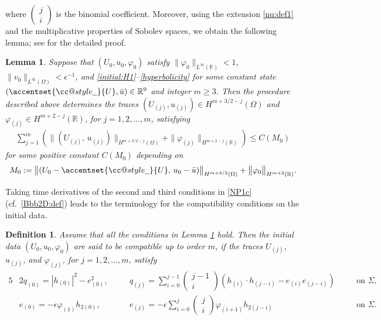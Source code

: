 \documentclass[twoside,11pt]{article}
\makeatletter
\numberwithin{equation}{section}
\newtheorem{lemma}{Lemma}[section]
\newtheorem{definition}{Definition}[section]
\def\widebar{\accentset{{\cc@style\underline{\mskip10mu}}}}
\makeatother
\begin{document}
where $\left(\begin{smallmatrix}
	j \\[0.3mm] i
\end{smallmatrix}\right)$ is the binomial coefficient.
Moreover, using the extension \eqref{nu:def1} and the multiplicative properties of Sobolev spaces, we obtain the following lemma; see \cite[Lemma 4.2.1]{M01MR1842775} for the detailed proof.
\begin{lemma} \label{lem:CA1}
	Suppose that %
	$(U_0,u_0,\varphi_0)$ satisfy $\|\varphi_0\|_{L^{\infty}(\mathbb{R})}<1$,
	{$\|v_0\|_{L^{\infty}(\Omega)}<\epsilon^{-1}$,} and \eqref{initial:H1}--\eqref{hyperbolicity} for some constant state $(\widebar{U},\bar{u})\in\mathbb{R}^9$ and integer $m\geq 3$. Then the procedure described above determines the traces
	$(U_{(j)},u_{(j)})\in H^{m+3/2-j}(\Omega)$ and
	$\varphi_{(j)}\in H^{m+2-j}(\mathbb{R})$, for $j=1,2,\ldots,m$,
	satisfying
	\begin{align}
		\sum_{j=1}^{m}
		\left( \|(U_{(j)},\,u_{(j)})\|_{H^{m+3/2-j}(\Omega) }
		+\|\varphi_{(j)}\|_{H^{m+2-j}(\mathbb{R}) }
		\right)\leq C(M_0)
		\nonumber
	\end{align}
	for some positive constant $C(M_0)$ depending on
	\begin{align} \label{M0:def}
		M_0:=\big\|(U_{0}-\widebar{U},\, u_{0}-\bar{u})\big\|_{H^{m+3/2}(\Omega) } +\big\|\varphi_{0}\big\|_{H^{m+2}(\mathbb{R}) } .
	\end{align}
\end{lemma}

Taking time derivatives of the second and third conditions in \eqref{NP1c} (cf.~\eqref{Bbb2D:def}) leads to the terminology for the compatibility conditions on the initial data.
\begin{definition}
	\label{def:1}
	Assume that all the conditions in Lemma \ref{lem:CA1} hold.
	Then the initial data $(U_0, u_0, \varphi_0)$ are said to be compatible up to order $m$,
	if the traces $U_{(j)}$, $u_{(j)}$, and $\varphi_{(j)}$, for $j=1,2,\ldots,m$,  satisfy
	\begin{alignat}{5}
		\label{comp1}
		&  2q_{(0)}= |h_{(0)}|^2-  e_{(0)} ^2,\quad &&
		q_{(j)} = \sum_{i=0}^{j -1}  \begin{pmatrix}
			j-1 \\ i
		\end{pmatrix}
		\left(h_{(i)}\cdot h_{(j-i)}-e_{(i)}e_{(j-i)}\right) \quad&&\textrm{on }\Sigma,\\
		\label{comp2}
		& e_{(0)}=-\epsilon \varphi_{(1)} h_{2(0)},\quad &&
		e_{(j)} = -\epsilon\sum_{i=0}^{j }  \begin{pmatrix}
			j \\ i
		\end{pmatrix} \varphi_{(i+1)}h_{2(j-i)}
		\quad&&\textrm{on }\Sigma.
	\end{alignat}
\end{definition}
\end{document}

